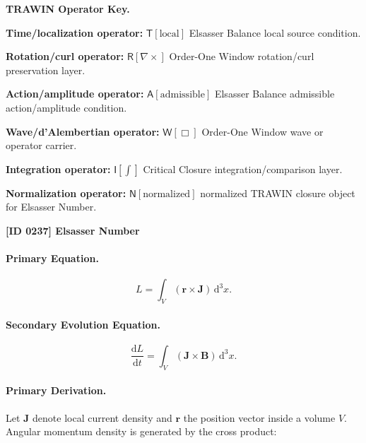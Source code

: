 \par\vspace{0.45\baselineskip}
\noindent\begin{minipage}[t]{\linewidth}
\begingroup
\small
\raggedright
\textbf{TRAWIN Operator Key.}\par
\noindent\textbf{Time/localization operator:} $\mathsf{T}\!\left[\mathrm{local}\right]$ Elsasser Balance local source condition.\par
\noindent\textbf{Rotation/curl operator:} $\mathsf{R}\!\left[\nabla\times\right]$ Order-One Window rotation/curl preservation layer.\par
\noindent\textbf{Action/amplitude operator:} $\mathsf{A}\!\left[\mathrm{admissible}\right]$ Elsasser Balance admissible action/amplitude condition.\par
\noindent\textbf{Wave/d'Alembertian operator:} $\mathsf{W}\!\left[\Box\right]$ Order-One Window wave or operator carrier.\par
\noindent\textbf{Integration operator:} $\mathsf{I}\!\left[\int\right]$ Critical Closure integration/comparison layer.\par
\noindent\textbf{Normalization operator:} $\mathsf{N}\!\left[\mathrm{normalized}\right]$ normalized TRAWIN closure object for Elsasser Number.\par
\endgroup
\end{minipage}

\clearpage
\noindent\textbf{[ID 0237] Elsasser Number}\par
\vspace{0.35em}
\paragraph{Primary Equation.}
\begin{equation}
L
=
\int_V
(\mathbf{r}\times\mathbf{J})
\,\mathrm{d}^3x .
\end{equation}

\paragraph{Secondary Evolution Equation.}
\begin{equation}
\frac{\mathrm{d}L}{\mathrm{d}t}
=
\int_V
(\mathbf{J}\times\mathbf{B})
\,\mathrm{d}^3x .
\end{equation}

\paragraph{Primary Derivation.}
Let $\mathbf{J}$ denote local current density and $\mathbf{r}$ the position vector inside a volume $V$.  
Angular momentum density is generated by the cross product:

